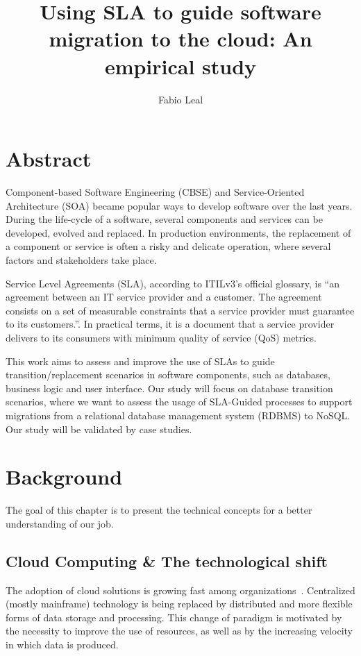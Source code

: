 \documentclass{article}
\begin{document}
\title{Using SLA to guide software migration to the cloud: An empirical study}
\author{Fabio Leal}
\maketitle  


\section{Abstract}
Component-based Software Engineering (CBSE) and Service-Oriented Architecture (SOA) became  popular ways to develop software over the last years. During the life-cycle of a software, several components and services can be developed, evolved and replaced. In production environments, the replacement of a component or service is often a risky and delicate operation, where several factors and stakeholders take place.

Service Level Agreements (SLA), according to ITILv3's official glossary, is ``an agreement between an IT service provider and a customer. The agreement consists on a set of measurable constraints that a service provider must guarantee to its customers.''. In practical terms, it is a document that a service provider delivers to its consumers with minimum quality of service (QoS) metrics.

This work aims to assess and improve the use of SLAs to guide transition/replacement scenarios in software components, such as databases, business logic and user interface. Our study will focus on database transition scenarios, where we want to assess the usage of SLA-Guided processes to support migrations from a relational database management system (RDBMS) to NoSQL. Our study will be validated by case studies.


\section{Background}
The goal of this chapter is to present the technical concepts for a better understanding of our job. 

\subsection{Cloud Computing \& The technological shift}

The adoption of cloud solutions is growing fast among organizations~\cite{6546068}.
Centralized (mostly mainframe) technology is being replaced by distributed and more flexible forms of data storage and processing.
This change of paradigm is motivated by the necessity to improve the use of resources, as well as by the increasing velocity in which data is produced.
\end{document}
